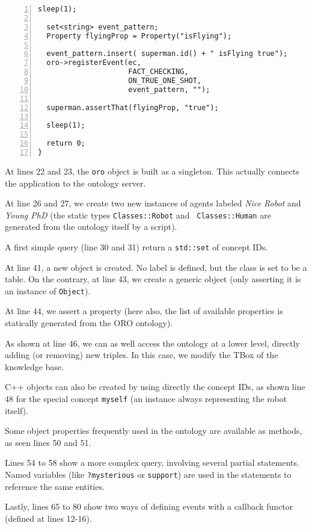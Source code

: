 \begin{lstlisting}[numbers=left,caption=Example of interaction with {\tt oro-server} in C++, label = code|ex-cpp]
  sleep(1);
  
  set<string> event_pattern;
  Property flyingProp = Property("isFlying");
  
  event_pattern.insert( superman.id() + " isFlying true");
  oro->registerEvent(ec, 
                     FACT_CHECKING, 
                     ON_TRUE_ONE_SHOT, 
                     event_pattern, "");
  
  superman.assertThat(flyingProp, "true");
  
  sleep(1);
  
  return 0;
}

\end{lstlisting}

At lines 22 and 23, the {\tt oro} object is built as a singleton. This
actually connects the application to the ontology server.

At line 26 and 27, we create two new instances of agents labeled \emph{Nice
Robot} and \emph{Young PhD} (the static types {\tt Classes::Robot} and {\tt
Classes::Human} are generated from the ontology itself by a script).

A first simple query (line 30 and 31) return a {\tt std::set} of concept IDs.

At line 41, a new object is created. No label is defined, but the
class is set to be a table. On the contrary, at line 43, we create a generic
object (only asserting it is an instance of {\tt Object}).

At line 44, we assert a property (here also, the list of available properties is
statically generated from the ORO ontology).

As shown at line 46, we can as well access the ontology at a lower level,
directly adding (or removing) new triples. In this case, we modify the TBox of
the knowledge base.

C++ objects can also be created by using directly the concept IDs, as shown
line 48 for the special concept {\tt myself} (an instance always representing
the robot itself).

Some object properties frequently used in the ontology are
available as methods, as seen lines 50 and 51.

Lines 54 to 58 show a more complex query, involving several partial statements.
Named variables (like {\tt ?mysterious} or {\tt support}) are used in the
statements to reference the same entities.

Lastly, lines 65 to 80 show two ways of defining events with a callback functor
(defined at lines 12-16).

